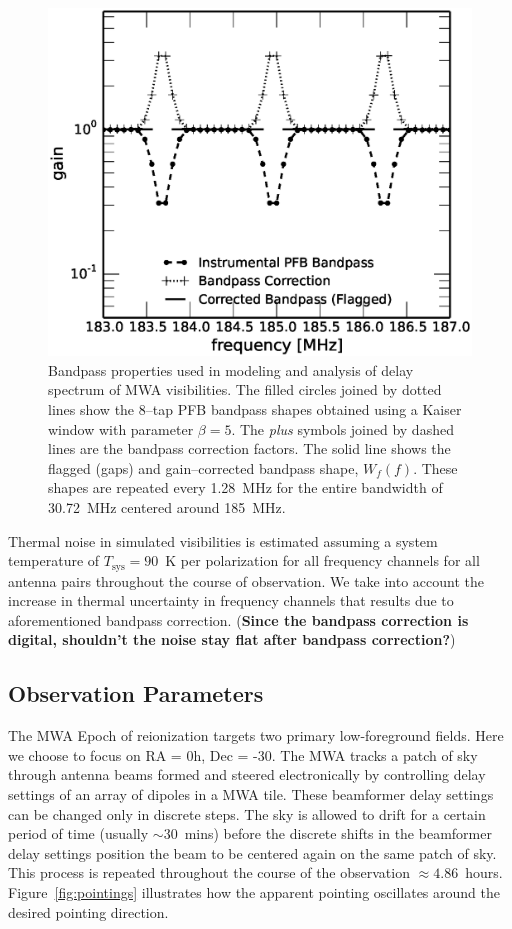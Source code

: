 \documentclass[preprint2,iop,numberedappendix]{emulateapj}
\begin{document}
\begin{figure}[htb]
\centering
\includegraphics[width=\linewidth]{figures/v1_0/bandpass_properties}
\caption{Bandpass properties used in modeling and analysis of delay spectrum of MWA visibilities. The filled circles joined by dotted lines show the 8--tap PFB bandpass shapes obtained using a Kaiser window with parameter $\beta=5$. The {\it plus} symbols joined by dashed lines are the bandpass correction factors. The solid line shows the flagged (gaps) and gain--corrected bandpass shape, $W_f(f)$. These shapes are repeated every 1.28~MHz for the entire bandwidth of 30.72~MHz centered around 185~MHz. \label{fig:bandpass}}
\end{figure}

Thermal noise in simulated visibilities is estimated assuming a system temperature of $T_\textrm{sys}=90$~K per polarization for all frequency channels for all antenna pairs throughout the course of observation. We take into account the increase in thermal uncertainty in frequency channels that results due to aforementioned bandpass correction. ({\bf Since the bandpass correction is digital, shouldn't the noise stay flat after bandpass correction?})

\subsection{Observation Parameters}\label{sec:obsparms}

The MWA Epoch of reionization targets two primary low-foreground fields. Here we choose to focus on RA = 0h, Dec = -30\arcdeg.  The MWA tracks a patch of sky through antenna beams formed and steered electronically by controlling delay settings of an array of dipoles in a MWA tile. These beamformer delay settings can be changed only in discrete steps. The sky is allowed to drift for a certain period of time (usually $\sim 30$~mins) before the discrete shifts in the beamformer delay settings position the beam to be centered again on the same patch of sky. This process is repeated throughout the course of the observation $\approx 4.86$~hours. Figure~\ref{fig:pointings} illustrates how the apparent pointing oscillates around the desired pointing direction. 
\end{document}
